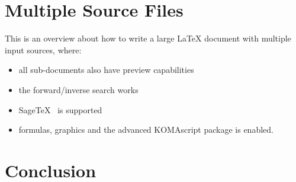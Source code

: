 \documentclass[11pt,
     DIV=14,
     oneside,
     dottedtoc,
     headings=normal,
     headinclude=true,
     footinclude=true,
     parskip=half]{scrreprt}
\begin{document}
\chapter*{Multiple Source Files}

This is an overview about how to write a large \LaTeX
document with multiple input sources, where:

\begin{itemize}
\item all sub-documents also have preview capabilities
\item the forward/inverse search works
\item SageTeX~\cite{sagetex} is supported
\item formulas, graphics and the advanced KOMAscript package is enabled.
\end{itemize}

\tableofcontents






\chapter{Conclusion}

\printbibliography
\end{document}
